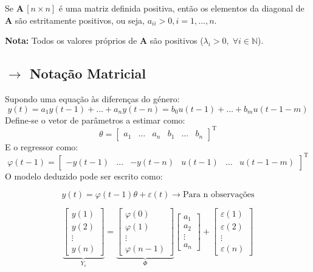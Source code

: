 
\begin{theo}{}
   Se $\pmb{A}\, [n\times n]$ é uma matriz definida positiva, então os elementos da diagonal de $\pmb{A}$ são estritamente positivos, ou seja, $a_{ii} > 0, i = 1, \dots, n$. 
   
   \noindent \textbf{Nota:} Todos os valores próprios de $\pmb{A}$ são positivos ($\lambda_i > 0,\; \forall i \in \mathbb{N}$).
\end{theo}
\clearpage
\subsection[5.2 Notação Matricial]{$\rightarrow$ Notação Matricial}
Supondo uma equação às diferenças do género:
$$
    y(t) = a_1 y(t-1) + \dots + a_n y(t-n) = b_0 u(t-1) + \dots + b_m u(t - 1 - m)
$$
\noindent Define-se o vetor de parâmetros a estimar como:
$$
    \theta = \begin{bmatrix} a_1 & \dots & a_n & b_1 & \dots & b_n  \end{bmatrix}^\text{T}
$$
\noindent E o regressor como:
$$
    \varphi(t - 1) = \begin{bmatrix} -y(t-1) & \dots & -y(t-n) & u(t-1) & \dots & u(t-1-m)  \end{bmatrix}^\text{T}
$$
\noindent O modelo deduzido pode ser escrito como:

$$
    y(t) = \varphi(t - 1)\theta + \varepsilon(t) \rightarrow \text{Para n observações}
$$

$$
    \underbrace{\begin{bmatrix} y(1) \\ y(2) \\ \vdots \\ y(n) \end{bmatrix}}_{Y_e}= 
    \underbrace{\begin{bmatrix}  \varphi(0) \\ \varphi(1) \\ \vdots \\ \varphi(n - 1)\end{bmatrix}}_{\Phi}
    \begin{bmatrix} a_1 \\ a_2 \\ \vdots \\ a_n\end{bmatrix} + 
    \begin{bmatrix} \varepsilon(1) \\ \varepsilon(2) \\ \vdots \\ \varepsilon(n)\end{bmatrix}
$$

